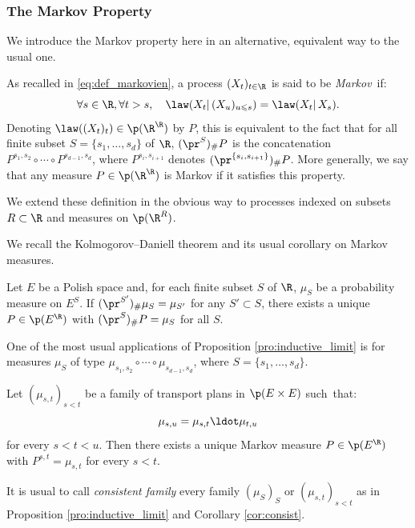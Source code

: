 \subsubsection{The Markov Property}

We introduce the Markov property here in an alternative, equivalent way to the usual one.

\begin{remdefi}\label{defi:markov2}As recalled in \eqref{eq:def_markovien}, a process $(X_t)_{t\in\R}$ is said to be \emph{Markov}~if:\vspace*{-3pt}
\[
\forall s\in\R,\forall t>s,\quad \law(X_t|\,(X_{u})_{u\leqslant s})=\law(X_t|\,X_{s}).
\]
Denoting $\law((X_t)_t)\in\p(\R^\R)$ by $P$, this is equivalent to the fact that for all finite subset $S=\{s_1,\ldots,s_d\}$ of $\R$, $(\pr^S)_\#P$ is the concatenation $P^{s_1,s_2}\circ\cdots\circ P^{s_{d-1},s_d}$, where $P^{s_i,s_{i+1}}$ denotes $(\pr^{\{s_i,s_{i+1}\}})_\#P$. More generally, we say that any measure $P\in\p(\R^\R)$ is Markov if it satisfies this property.

We extend these definition in the obvious way to processes indexed on subsets $R\subset \R$ and measures on $\p(\R^R)$.
\end{remdefi}

We recall the Kolmogorov--Daniell theorem and its usual corollary on Markov measures.

\begin{pro}\label{pro:inductive_limit}
Let $E$ be a Polish space and, for each finite subset $S$ of\/ $\R$, $\mu_S$ be a probability measure on $E^S$. If $(\pr^{S'})_\#\mu_S=\mu_{S'}$ for any $S'\subset S$, there exists a unique $P\in \p(E^\R)$ with $(\pr^S)_\#P=\mu_S$ for all $S$.
\end{pro}

One of the most usual applications of Proposition \ref{pro:inductive_limit} is for measures $\mu_S$ of type $\mu_{s_1,s_2}\circ\cdots\circ \mu_{s_{d-1},s_d}$, where $S=\{s_1,\ldots,s_d\}$.

\begin{cor}\label{cor:consist}
Let $(\mu_{s,t})_{s<t}$ be a family of transport plans in $\p(E\times E)$ such~that:\vspace*{-3pt}
\[\mu_{s,u}=\mu_{s,t}{}\ldot\mu_{t,u}\]
for every $s<t<u$. Then there exists a unique Markov measure $P\in \p(E^\R)$ with $P^{s,t}=\mu_{s,t}$ for every $s<t$.
\end{cor}

\begin{defi}\label{defi:consist}It is usual to call \emph{consistent family} every family $(\mu_S)_S$ or $(\mu_{s,t})_{s<t}$ as in Proposition \ref{pro:inductive_limit} and Corollary \ref{cor:consist}.
\end{defi}

